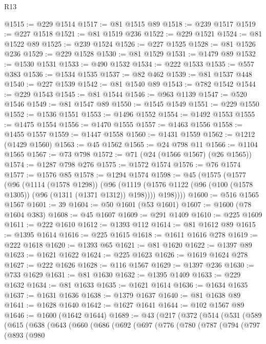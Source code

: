 \begin{lexlean}{R13}
\begin{coremodule}
@1515 := @229 @1514
@1517 := @81 @1515 @89
@1518 := @239 @1517
@1519 := @227 @1518
@1521 := @81 @1519 @236
@1522 := @229 @1521
@1524 := @81 @1522 @89
@1525 := @239 @1524
@1526 := @227 @1525
@1528 := @81 @1526 @236
@1529 := @229 @1528
@1530 := @81 @1529
@1531 := @1479 @89
@1532 := @1530 @1531
@1533 := @490 @1532
@1534 := @222 @1533
@1535 := @557 @383
@1536 := @1534 @1535
@1537 := @82 @462
@1539 := @81 @1537 @448
@1540 := @227 @1539
@1542 := @81 @1540 @89
@1543 := @782 @1542
@1544 := @229 @1543
@1545 := @81 @1544
@1546 := @963 @1139
@1547 := @520 @1546
@1549 := @81 @1547 @89
@1550 := @1545 @1549
@1551 := @229 @1550
@1552 := @1536 @1551
@1553 := @1496 @1552
@1554 := @1492 @1553
@1555 := @1475 @1554
@1556 := @1470 @1555
@1557 := @1463 @1556
@1558 := @1455 @1557
@1559 := @1447 @1558
@1560 := @1431 @1559
@1562 := @1212 (@1429 @1560)
@1563 := @45 @1562
@1565 := @24 @798 @11
@1566 := @1104 @1565
@1567 := @73 @798
@1572 := @71 (@24 (@1566 @1567) (@26 @1565))
@1574 := @1287 @798 @276
@1575 := @1572 @1574
@1576 := @76 @1574
@1577 := @1576 @85
@1578 := @1294 @1574
@1598 := @45
    (@1575
      (@1577
        (@96
          (@1114 (@1578 @1298))
          (@96
            (@1119 (@1576 @1122 (@96 (@100 (@1578 @1305)) (@96 (@1311 (@1371 @1312)) @198))))
            @198))))
@1600 := @516 @1565 @1567
@1601 := 39
@1604 := @50 @1601 (@53 @1601)
@1607 := @1600 (@78 @1604 @383)
@1608 := @45 @1607
@1609 := @291 @1409
@1610 := @225 @1609
@1611 := @222 @1610
@1612 := @1393 @112
@1614 := @81 @1612 @89
@1615 := @1395 @1614
@1616 := @225 @1615
@1618 := @1611 @1616 @278
@1619 := @222 @1618
@1620 := @1393 @65
@1621 := @81 @1620
@1622 := @1397 @89
@1623 := @1621 @1622
@1624 := @225 @1623
@1626 := @1619 @1624 @278
@1627 := @222 @1626
@1628 := @116 @1567
@1629 := @1397 @236
@1630 := @733 @1629
@1631 := @81 @1630
@1632 := @1395 @1409
@1633 := @229 @1632
@1634 := @81 @1633
@1635 := @1621 @1614
@1636 := @1634 @1635
@1637 := @1631 @1636
@1638 := @1379 @1637
@1640 := @81 @1638 @89
@1641 := @1628 @1640
@1642 := @1627 @1641
@1644 := @102 @1567 @89
@1646 := @1600 (@1642 @1644)
@1689 := @43
    (@217
      (@372
        (@514
          (@531
            (@589
              (@615
                (@638
                  (@643
                    (@660
                      (@686
                        (@692
                          (@697
                            (@776
                              (@780
                                (@787
                                  (@794
                                    (@797
                                      (@893
                                        (@980

\end{coremodule}
\end{lexlean}
